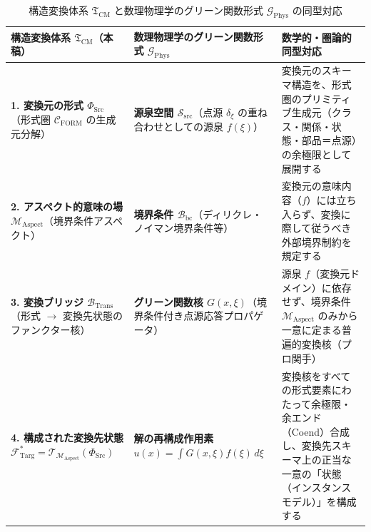 \documentclass[11pt,a4paper]{ltjsarticle}
\theoremstyle{definition}
\theoremstyle{plain}
\theoremstyle{remark}
\newcommand{\CFORM}{\mathcal{C}_{\mathrm{FORM}}}
\newcommand{\MAspect}{\mathcal{M}_{\mathrm{Aspect}}}
\newcommand{\BTrans}{\mathcal{B}_{\mathrm{Trans}}}
\begin{document}
\begin{table}[htbp]
\centering
\caption{構造変換体系 $\mathfrak{T}_{\mathrm{CM}}$ と数理物理学のグリーン関数形式 $\mathcal{G}_{\mathrm{Phys}}$ の同型対応}
\label{tab:green-correspondence}
\renewcommand{\arraystretch}{1.35}
\begin{tabularx}{\textwidth}{>{\raggedright\arraybackslash}p{} >{\raggedright\arraybackslash}p{} >{\raggedright\arraybackslash}X}
\toprule
\textbf{構造変換体系 $\mathfrak{T}_{\mathrm{CM}}$（本稿）} & \textbf{数理物理学のグリーン関数形式 $\mathcal{G}_{\mathrm{Phys}}$} & \textbf{数学的・圏論的同型対応} \\
\midrule
\textbf{1. 変換元の形式 $\Phi_{\mathrm{Src}}$}（形式圏 $\CFORM$ の生成元分解） & \textbf{源泉空間 $\mathcal{S}_{\mathrm{src}}$}（点源 $\delta_\xi$ の重ね合わせとしての源泉 $f(\xi)$） & 変換元のスキーマ構造を、形式圏のプリミティブ生成元（クラス・関係・状態・部品＝点源）の余極限として展開する \\
\textbf{2. アスペクト的意味の場 $\MAspect$}（境界条件アスペクト） & \textbf{境界条件 $\mathcal{B}_{\mathrm{bc}}$}（ディリクレ・ノイマン境界条件等） & 変換元の意味内容（$f$）には立ち入らず、変換に際して従うべき外部境界制約を規定する \\
\textbf{3. 変換ブリッジ $\BTrans$}（形式 $\to$ 変換先状態のファンクター核） & \textbf{グリーン関数核 $G(x, \xi)$}（境界条件付き点源応答プロパゲータ） & 源泉 $f$（変換元ドメイン）に依存せず、境界条件 $\MAspect$ のみから一意に定まる普遍的変換核（プロ関手） \\
\textbf{4. 構成された変換先状態 $\mathcal{F}_{\mathrm{Targ}}^* = \mathcal{T}_{\MAspect}(\Phi_{\mathrm{Src}})$} & \textbf{解の再構成作用素 $u(x) = \int G(x, \xi) f(\xi)\, d\xi$} & 変換核をすべての形式要素にわたって余極限・余エンド（Coend）合成し、変換先スキーマ上の正当な一意の「状態（インスタンスモデル）」を構成する \\
\bottomrule
\end{tabularx}
\end{table}
\end{document}
